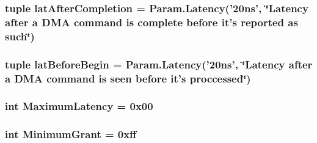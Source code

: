 \label{classCopyEngine_1_1CopyEngine_a9b18e7e4ee8e0f835496c9106eb519d5}
\hypertarget{classCopyEngine_1_1CopyEngine_a33fa458abcf6b35912dd7274c6731a99}{
\subsubsection[{latAfterCompletion}]{\setlength{\rightskip}{0pt plus 5cm}tuple {\bf latAfterCompletion} = Param.Latency('20ns', \char`\"{}Latency after a DMA command is complete before it's reported as such\char`\"{})}}
\label{classCopyEngine_1_1CopyEngine_a33fa458abcf6b35912dd7274c6731a99}
\hypertarget{classCopyEngine_1_1CopyEngine_af5297cce176584d7282d8d171dde6eb5}{
\subsubsection[{latBeforeBegin}]{\setlength{\rightskip}{0pt plus 5cm}tuple {\bf latBeforeBegin} = Param.Latency('20ns', \char`\"{}Latency after a DMA command is seen before it's proccessed\char`\"{})}}
\label{classCopyEngine_1_1CopyEngine_af5297cce176584d7282d8d171dde6eb5}
\hypertarget{classCopyEngine_1_1CopyEngine_a10460b79882894b983aca9f848f4ffaf}{
\subsubsection[{MaximumLatency}]{\setlength{\rightskip}{0pt plus 5cm}int {\bf MaximumLatency} = 0x00}}
\label{classCopyEngine_1_1CopyEngine_a10460b79882894b983aca9f848f4ffaf}
\hypertarget{classCopyEngine_1_1CopyEngine_a1f3ebd5623021488fb0bfa84f5aa357d}{
\subsubsection[{MinimumGrant}]{\setlength{\rightskip}{0pt plus 5cm}int {\bf MinimumGrant} = 0xff}}
